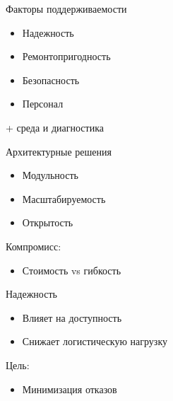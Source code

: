 \documentclass{beamer}
\begin{document}

\begin{frame}{Факторы поддерживаемости}
\begin{itemize}
    \item Надежность
    \item Ремонтопригодность
    \item Безопасность
    \item Персонал
\end{itemize}

\vspace{0.5cm}

+ среда и диагностика

\end{frame}


\begin{frame}{Архитектурные решения}
\begin{itemize}
    \item Модульность
    \item Масштабируемость
    \item Открытость
\end{itemize}

\vspace{0.5cm}

Компромисс:
\begin{itemize}
    \item Стоимость vs гибкость
\end{itemize}

\end{frame}


\begin{frame}{Надежность}
\begin{itemize}
    \item Влияет на доступность
    \item Снижает логистическую нагрузку
\end{itemize}

\vspace{0.5cm}

Цель:
\begin{itemize}
    \item Минимизация отказов
\end{itemize}

\end{frame}
\end{document}
